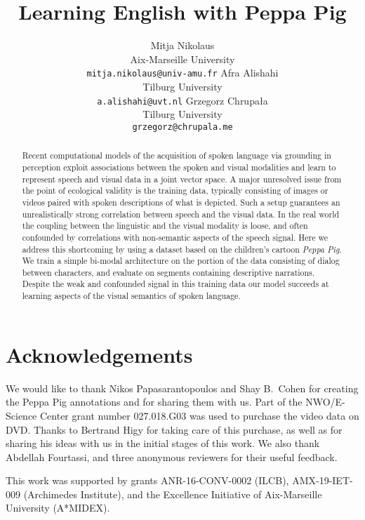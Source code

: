 \documentclass[11pt,a4paper]{article}
\begin{document}
\title{Learning English with Peppa Pig}

\author{Mitja Nikolaus\\
  Aix-Marseille University\\
  \texttt{mitja.nikolaus@univ-amu.fr}
  \And
  Afra Alishahi\\
  Tilburg University\\
  \texttt{a.alishahi@uvt.nl}
  \AND
  Grzegorz Chrupała\\
  Tilburg University\\
  \texttt{grzegorz@chrupala.me}}

\date{}


\maketitle
\begin{abstract}
  Recent computational models of the acquisition of spoken language
  via grounding in perception exploit associations between the spoken
  and visual modalities and learn to represent speech and visual data
  in a joint vector space. A major unresolved issue from the point of
  ecological validity is the training data, typically consisting of
  images or videos paired with spoken descriptions of what is
  depicted. Such a setup guarantees an unrealistically strong
  correlation between speech and the visual data.  In the real world
  the coupling between the linguistic and the visual modality is
  loose, and often confounded by correlations with non-semantic
  aspects of the speech signal. Here we address this shortcoming by
  using a dataset based on the children's cartoon {\it Peppa Pig}.  We
  train a simple bi-modal architecture on the portion of the data
  consisting of dialog between characters, and evaluate on segments
  containing descriptive narrations. Despite the weak and confounded
  signal in this training data our model succeeds at learning aspects
  of the visual semantics of spoken language.
\end{abstract}







\section*{Acknowledgements}
We would like to thank Nikos Papasarantopoulos and Shay B.\ Cohen for
creating the Peppa Pig annotations and for sharing them with us.
Part of the NWO/E-Science Center grant number 027.018.G03 was used to
purchase the video data on DVD. Thanks to Bertrand Higy for taking care of this
purchase, as well as for sharing his ideas with us in the initial stages of
this work. We also thank Abdellah Fourtassi, and three anonymous
reviewers for their useful feedback.

This work was supported by grants ANR-16-CONV-0002 (ILCB), AMX-19-IET-009 
(Archimedes Institute), and the Excellence Initiative of Aix-Marseille 
University (A*MIDEX).


\balance
%
\end{document}
